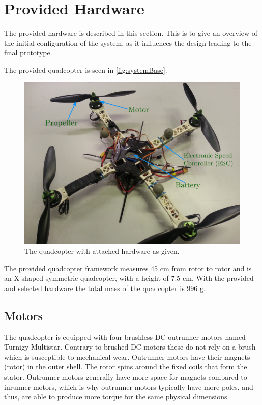 \section{Provided Hardware}\label{sec:hardware}
The provided hardware is described in this section. This is to give an overview of the initial configuration of the system, as it influences the design leading to the final prototype.


The provided quadcopter is seen in \autoref{fig:systemBase}.
\begin{figure}[H]
  \centering
  \includegraphics[width=.6\linewidth]{figures/quadcopterBaseLabels}
  \caption{The quadcopter with attached hardware as given.}
  \label{fig:systemBase}
\end{figure}

The provided quadcopter framework measures 45 cm from rotor to rotor and is an X-shaped symmetric quadcopter, with a height of 7.5 cm. With the provided and selected hardware the total mass of the quadcopter is 996 g.

\subsection{Motors}
The quadcopter is equipped with four brushless DC outrunner motors named Turnigy Multistar. Contrary to brushed DC motors these do not rely on a brush which is susceptible to mechanical wear. Outrunner motors have their magnets (rotor) in the outer shell. The rotor spins around the fixed coils that form the stator. Outrunner motors generally have more space for magnets compared to inrunner motors, which is why outrunner motors typically have more poles, and thus, are able to produce more torque for the same physical dimensions. 

